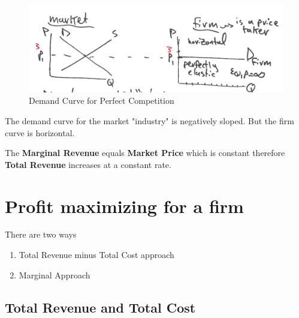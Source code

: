 \documentclass[../ECON-281-Notes.tex]{subfiles}
\begin{document}
\begin{figure}[!h]
  \centering
  \includegraphics[width=\columnwidth]{../assets/demand-curve-pc.png}
  \caption{Demand Curve for Perfect Competition}
  \label{fig:demand_curve_pc}
\end{figure}

The demand curve for the market "industry" is negatively sloped. But the firm curve is horizontal.

The \textbf{Marginal Revenue} equals \textbf{Market Price} which is constant therefore \textbf{Total Revenue} increases at a constant rate.

\section{Profit maximizing for a firm}
There are two ways
\begin{enumerate}
  \item Total Revenue minus Total Cost approach
  \item Marginal Approach
\end{enumerate}

\subsection{Total Revenue and Total Cost}
\end{document}
